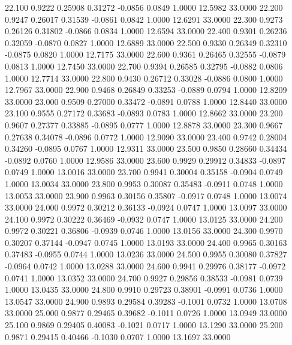  22.100   0.9222   0.25908   0.31272  -0.0856   0.0849   1.0000  12.5982  33.0000
  22.200   0.9247   0.26017   0.31539  -0.0861   0.0842   1.0000  12.6291  33.0000
  22.300   0.9273   0.26126   0.31802  -0.0866   0.0834   1.0000  12.6594  33.0000
  22.400   0.9301   0.26236   0.32059  -0.0870   0.0827   1.0000  12.6889  33.0000
  22.500   0.9330   0.26349   0.32310  -0.0875   0.0820   1.0000  12.7175  33.0000
  22.600   0.9361   0.26465   0.32555  -0.0879   0.0813   1.0000  12.7450  33.0000
  22.700   0.9394   0.26585   0.32795  -0.0882   0.0806   1.0000  12.7714  33.0000
  22.800   0.9430   0.26712   0.33028  -0.0886   0.0800   1.0000  12.7967  33.0000
  22.900   0.9468   0.26849   0.33253  -0.0889   0.0794   1.0000  12.8209  33.0000
  23.000   0.9509   0.27000   0.33472  -0.0891   0.0788   1.0000  12.8440  33.0000
  23.100   0.9555   0.27172   0.33683  -0.0893   0.0783   1.0000  12.8662  33.0000
  23.200   0.9607   0.27377   0.33885  -0.0895   0.0777   1.0000  12.8878  33.0000
  23.300   0.9667   0.27638   0.34078  -0.0896   0.0772   1.0000  12.9090  33.0000
  23.400   0.9742   0.28004   0.34260  -0.0895   0.0767   1.0000  12.9311  33.0000
  23.500   0.9850   0.28660   0.34434  -0.0892   0.0760   1.0000  12.9586  33.0000
  23.600   0.9929   0.29912   0.34833  -0.0897   0.0749   1.0000  13.0016  33.0000
  23.700   0.9941   0.30004   0.35158  -0.0904   0.0749   1.0000  13.0034  33.0000
  23.800   0.9953   0.30087   0.35483  -0.0911   0.0748   1.0000  13.0053  33.0000
  23.900   0.9963   0.30156   0.35807  -0.0917   0.0748   1.0000  13.0074  33.0000
  24.000   0.9972   0.30212   0.36133  -0.0924   0.0747   1.0000  13.0097  33.0000
  24.100   0.9972   0.30222   0.36469  -0.0932   0.0747   1.0000  13.0125  33.0000
  24.200   0.9972   0.30221   0.36806  -0.0939   0.0746   1.0000  13.0156  33.0000
  24.300   0.9970   0.30207   0.37144  -0.0947   0.0745   1.0000  13.0193  33.0000
  24.400   0.9965   0.30163   0.37483  -0.0955   0.0744   1.0000  13.0236  33.0000
  24.500   0.9955   0.30080   0.37827  -0.0964   0.0742   1.0000  13.0288  33.0000
  24.600   0.9941   0.29976   0.38177  -0.0972   0.0741   1.0000  13.0352  33.0000
  24.700   0.9927   0.29856   0.38533  -0.0981   0.0739   1.0000  13.0435  33.0000
  24.800   0.9910   0.29723   0.38901  -0.0991   0.0736   1.0000  13.0547  33.0000
  24.900   0.9893   0.29584   0.39283  -0.1001   0.0732   1.0000  13.0708  33.0000
  25.000   0.9877   0.29465   0.39682  -0.1011   0.0726   1.0000  13.0949  33.0000
  25.100   0.9869   0.29405   0.40083  -0.1021   0.0717   1.0000  13.1290  33.0000
  25.200   0.9871   0.29415   0.40466  -0.1030   0.0707   1.0000  13.1697  33.0000
